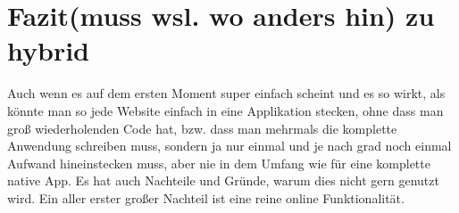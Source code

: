 \section{Fazit(muss wsl. wo anders hin) zu hybrid}
Auch wenn es auf dem ersten Moment super einfach scheint und es so wirkt, als könnte man so jede Website einfach in eine Applikation stecken, ohne dass man groß wiederholenden Code hat, bzw. dass man mehrmals die komplette Anwendung schreiben muss, sondern ja nur einmal und je nach grad noch einmal Aufwand hineinstecken muss, aber nie in dem Umfang wie für eine komplette native App. 
Es hat auch Nachteile und Gründe, warum dies nicht gern genutzt wird.
Ein aller erster großer Nachteil ist eine reine online Funktionalität. 